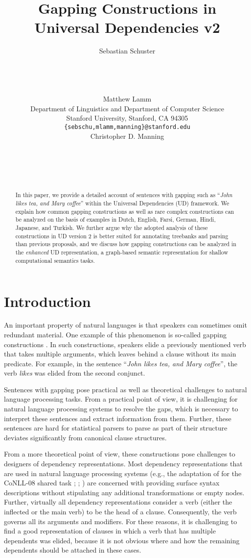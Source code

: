 \documentclass[11pt]{article}
\title{Gapping Constructions in Universal Dependencies v2}
\author{Sebastian Schuster \\
\\
 \\
\\
 \\\And
  Matthew Lamm \\
    Department of Linguistics and Department of Computer Science\\
  Stanford University, Stanford, CA 94305 \\
  {\tt \{sebschu,mlamm,manning\}@stanford.edu} \\\And
Christopher D. Manning \\
    \\
   \\
   \\
  \\}
\date{}
\begin{document}
\maketitle
\begin{abstract}

In this paper, we provide a detailed account of sentences 
with gapping such as ``\textit{John likes tea, 
and Mary coffee}'' within the Universal Dependencies (UD) 
framework. We explain how common gapping constructions 
as well as rare complex constructions can be analyzed 
on the basis of examples in Dutch, English, Farsi, German, 
Hindi, Japanese, and Turkish. We further argue why the adopted 
analysis of these constructions in UD version 2 is better suited for 
annotating treebanks and parsing than previous proposals, and we 
discuss how gapping constructions can be analyzed in the \textit{enhanced} 
UD representation, a graph-based semantic representation for 
shallow computational semantics tasks.
  
\end{abstract}

\section{Introduction}
An important property of natural languages is that speakers can sometimes 
omit redundant material. One example of this phenomenon is so-called 
gapping constructions \cite{Ross1970}. In such constructions, speakers elide a 
previously mentioned verb that takes multiple arguments, which leaves behind 
a clause without its main predicate. For example, in the sentence ``\textit{John likes tea, 
and Mary coffee}'', the verb \textit{likes} was elided from the second conjunct. 

Sentences with gapping pose practical as well as theoretical 
challenges to natural language processing tasks. From a practical point of view, 
it is challenging for natural language processing systems to resolve the gaps, 
which is necessary to interpret these sentences and extract information from 
them. Further, these sentences are hard for statistical parsers to parse as part 
of their structure deviates significantly from canonical clause structures.

From a more theoretical point of view, these constructions pose challenges to 
designers of dependency representations. Most dependency representations
that are used in natural language processing systems
(e.g., the adaptation of  for the CoNLL-08 shared task 
\cite{Surdeanu2008}; ; ) 
are concerned with providing surface syntax descriptions without stipulating 
any additional transformations or empty nodes. Further, virtually all dependency 
representations consider a verb (either the inflected or the main verb) to be the 
head of a clause. Consequently, the verb governs all its arguments and modifiers. 
For these reasons, it is challenging to find a good representation of clauses in which 
a verb that has multiple dependents was elided, because it is not obvious where 
and how the remaining dependents should be attached in these cases.
\end{document}

